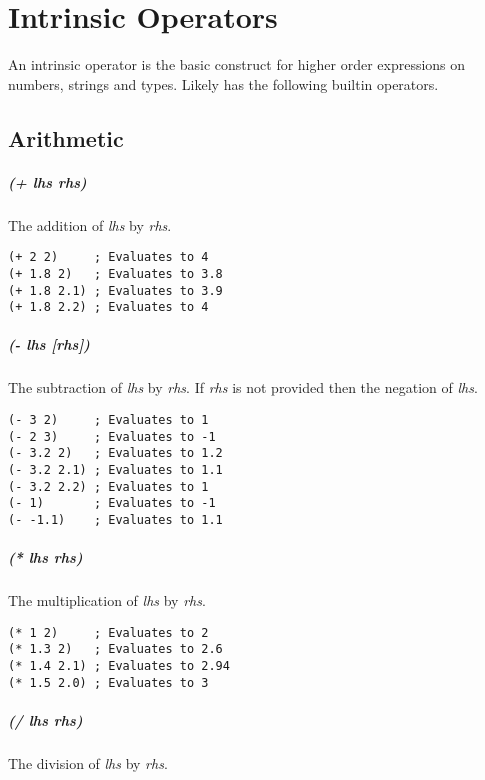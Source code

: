\documentclass[twoside=false, numbers=noenddot]{scrbook}
\begin{document}
\chapter{Intrinsic Operators}
An intrinsic operator is the basic construct for higher order expressions on numbers, strings and types.
Likely has the following builtin operators.

\section{Arithmetic}
\paragraph{(+ \emph{lhs} \emph{rhs})}
The addition of \emph{lhs} by \emph{rhs}.

\begin{verbatim}
(+ 2 2)     ; Evaluates to 4
(+ 1.8 2)   ; Evaluates to 3.8
(+ 1.8 2.1) ; Evaluates to 3.9
(+ 1.8 2.2) ; Evaluates to 4
\end{verbatim}

\paragraph{(- \emph{lhs} [\emph{rhs}])}
The subtraction of \emph{lhs} by \emph{rhs}.
If \emph{rhs} is not provided then the negation of \emph{lhs}.

\begin{verbatim}
(- 3 2)     ; Evaluates to 1
(- 2 3)     ; Evaluates to -1
(- 3.2 2)   ; Evaluates to 1.2
(- 3.2 2.1) ; Evaluates to 1.1
(- 3.2 2.2) ; Evaluates to 1
(- 1)       ; Evaluates to -1
(- -1.1)    ; Evaluates to 1.1
\end{verbatim}

\paragraph{(* \emph{lhs} \emph{rhs})}
The multiplication of \emph{lhs} by \emph{rhs}.

\begin{verbatim}
(* 1 2)     ; Evaluates to 2
(* 1.3 2)   ; Evaluates to 2.6
(* 1.4 2.1) ; Evaluates to 2.94
(* 1.5 2.0) ; Evaluates to 3
\end{verbatim}

\paragraph{(/ \emph{lhs} \emph{rhs})}
The division of \emph{lhs} by \emph{rhs}.
\end{document}
